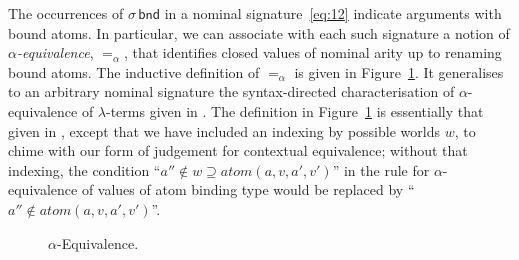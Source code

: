 \documentclass{LMCS}
\theoremstyle{plain}
\theoremstyle{definition}
\newcommand{\aeq}{=_{\alpha}}
\newcommand{\ar}[1][\sigma]{#1}
\newcommand{\atm}[1][a]{#1}
\newcommand{\ATM}{\kw{atm}}
\newcommand{\atoms}{\mathit{atom}}
\newcommand{\BINDTY}{\kw{bnd}}
\newcommand{\BINDVAL}[2]{\mathopen{\text{\normalfont\guillemotleft}}#1
  \mathclose{\text{\normalfont\guillemotright}}#2}
\newcommand{\CON}[1][C]{\kw{#1}}
\newcommand{\dty}{\delta}
\newcommand{\ent}{\vdash}
\newcommand{\FUNTY}{\mathbin{\rightarrow}}
\newcommand{\LP}{\mathopen{\kw{(}}}
\newcommand{\kw}[1]{\mathsf{#1}}
\newcommand{\ofty}{:}
\newcommand{\OFTY}{\mathrel{\kw{:}}}
\newcommand{\PRODTY}{\mathbin{\kw{*}}}
\newcommand{\rename}[2]{\{#2/#1\}}
\newcommand{\RP}{\mathclose{\kw{)}}}
\newcommand{\UNIT}{\kw{unit}}
\newcommand{\UNITVAL}{\LP\RP}
\newcommand{\val}[1][v]{#1}
\newcommand{\w}[1][w]{#1}
\begin{document}
The occurrences of $\ar\,\BINDTY$ in a nominal signature~\eqref{eq:12}
indicate arguments with bound atoms. In particular, we can associate
with each such signature a notion of \emph{$\alpha$-equivalence},
$\aeq$, that identifies closed values of nominal arity up to renaming
bound atoms. The inductive definition of $\aeq$ is given in
Figure~\ref{fig:alpe}. It generalises to an arbitrary nominal
signature the syntax-directed characterisation of $\alpha$-equivalence
of $\lambda$-terms given in \cite[p.~36]{GunterCA:sempls}. The
definition in Figure~\ref{fig:alpe} is essentially that given in
\cite{PittsAM:alpsri}, except that we have included an indexing by
possible worlds $\w$, to chime with our form of judgement for
contextual equivalence; without that indexing, the condition
``$\atm''\notin\w\supseteq\atoms(\atm,\val,\atm',\val')$'' in the rule
for $\alpha$-equivalence of values of atom binding type would be
replaced by ``$\atm''\notin\atoms(\atm,\val,\atm',\val')$''.

\begin{figure}\small
  \caption{$\alpha$-Equivalence.}
  \label{fig:alpe}
\end{figure}
\end{document}
